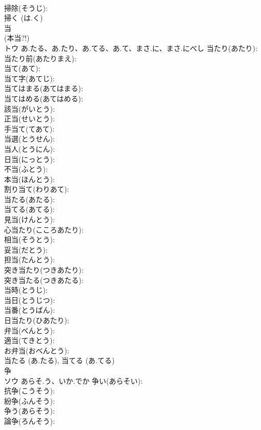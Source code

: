 \documentclass[8pt]{extreport}
\begin{document}
\begin{CJK}{UTF8}{min}
\\	掃除(そうじ): 
\\	掃く (は.く)
\\	当			
\\	(本当?!)
\\	トウ	あ.たる、あ.たり、あ.てる、あ.て、まさ.に、まさ.にべし	当たり(あたり): 
\\	当たり前(あたりまえ): 
\\	当て(あて): 
\\	当て字(あてじ): 
\\	当てはまる(あてはまる): 
\\	当てはめる(あてはめる): 
\\	該当(がいとう): 
\\	正当(せいとう): 
\\	手当て(てあて): 
\\	当選(とうせん): 
\\	当人(とうにん): 
\\	日当(にっとう): 
\\	不当(ふとう): 
\\	本当(ほんとう): 
\\	割り当て(わりあて): 
\\	当たる(あたる): 
\\	当てる(あてる): 
\\	見当(けんとう): 
\\	心当たり(こころあたり): 
\\	相当(そうとう): 
\\	妥当(だとう): 
\\	担当(たんとう): 
\\	突き当たり(つきあたり): 
\\	突き当たる(つきあたる): 
\\	当時(とうじ): 
\\	当日(とうじつ): 
\\	当番(とうばん): 
\\	日当たり(ひあたり): 
\\	弁当(べんとう): 
\\	適当(てきとう): 
\\	お弁当(おべんとう): 
\\	当たる (あ.たる), 当てる (あ.てる)
\\	争			
\\	ソウ	あらそ.う、いか.でか	争い(あらそい): 
\\	抗争(こうそう): 
\\	紛争(ふんそう): 
\\	争う(あらそう): 
\\	論争(ろんそう): 

\end{CJK}
\end{document}
